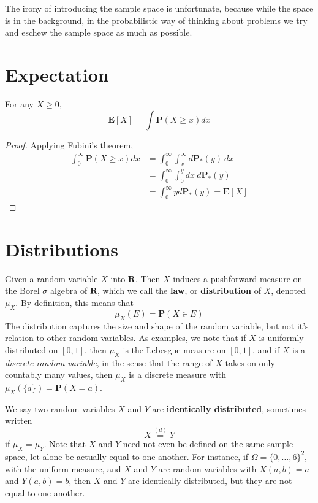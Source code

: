 The irony of introducing the sample space is unfortunate, because while the space is in the background, in the probabilistic way of thinking about problems we try and eschew the sample space as much as possible.

\section{Expectation}

\begin{theorem}
    For any $X \geq 0$,
    \[ \mathbf{E}[X] = \int \mathbf{P}(X \geq x) dx \]
\end{theorem}
\begin{proof}
    Applying Fubini's theorem,
    \begin{align*}
        \int_0^\infty \mathbf{P}(X \geq x) dx &= \int_0^\infty \int_x^\infty d \mathbf{P}_*(y)\ dx\\
        &= \int_0^\infty \int_0^y dx\ d\mathbf{P}_*(y)\\
        &= \int_0^\infty y d\mathbf{P}_*(y) = \mathbf{E}[X]
    \end{align*}
\end{proof}

\section{Distributions}

Given a random variable $X$ into $\mathbf{R}$. Then $X$ induces a pushforward measure on the Borel $\sigma$ algebra of $\mathbf{R}$, which we call the {\bf law}, or {\bf distribution} of $X$, denoted $\mu_X$. By definition, this means that
%
\[ \mu_X(E) = \mathbf{P}(X \in E) \]
%
The distribution captures the size and shape of the random variable, but not it's relation to other random variables. As examples, we note that if $X$ is uniformly distributed on $[0,1]$, then $\mu_X$ is the Lebesgue measure on $[0,1]$, and if $X$ is a {\it discrete random variable}, in the sense that the range of $X$ takes on only countably many values, then $\mu_X$ is a discrete measure with $\mu_X(\{ a \}) = \mathbf{P}(X = a)$.

We say two random variables $X$ and $Y$ are {\bf identically distributed}, sometimes written
%
\[ X \overset{(d)}{=} Y \]
%
if $\mu_X = \mu_Y$. Note that $X$ and $Y$ need not even be defined on the same sample space, let alone be actually equal to one another. For instance, if $\Omega = \{ 0, \dots, 6 \}^2$, with the uniform measure, and $X$ and $Y$ are random variables with $X(a,b) = a$ and $Y(a,b) = b$, then $X$ and $Y$ are identically distributed, but they are not equal to one another.

